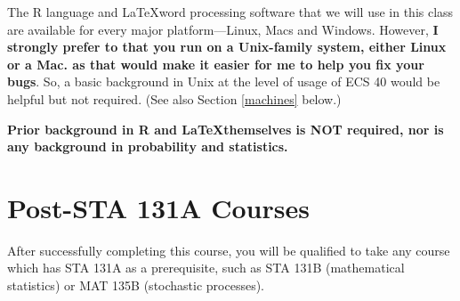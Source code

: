 The R language and \LaTeX word processing software that we will use in
this class are available for every major platform---Linux, Macs and
Windows.  However, {\bf I strongly prefer to that you run on a
Unix-family system, either Linux or a Mac.  as that would make it easier
for me to help you fix your bugs}.  So, a basic background in Unix at
the level of usage of ECS 40 would be helpful but not required.  (See
also Section \ref{machines} below.)

{\bf Prior background in R and \LaTeX themselves is NOT required, nor is
any background in probability and statistics.}

\section{Post-STA 131A Courses}

After successfully completing this course, you will be qualified to take
any course which has STA 131A as a prerequisite, such as STA 131B
(mathematical statistics) or MAT 135B (stochastic processes).






